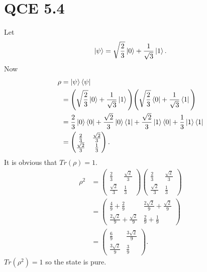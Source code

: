 \documentclass[10pt]{article}
\begin{document}
\section*{QCE 5.4}
Let 
\[
\ket{\psi} = \sqrt{\frac{2}{3}} \ket{0} + \frac{1}{\sqrt{3}} \ket{1}.
\]
Now 
\begin{align*}
\rho &= \ket{\psi} \bra{\psi} \\
        &= \Bigg( \sqrt{\frac{2}{3}} \ket{0} + \frac{1}{\sqrt{3}} \ket{1} \Bigg)\Bigg( \sqrt{\frac{2}{3}} \bra{0} + \frac{1}{\sqrt{3}} \bra{1} \Bigg) \\
        &= \frac{2}{3} \ket{0} \bra{0} + \frac{\sqrt{2}}{3} \ket{0} \bra{1} + \frac{\sqrt{2}}{3} \ket{1} \bra{0} + \frac{1}{3} \ket{1} \bra{1} \\
        &= \begin{pmatrix}
        \frac{2}{3} & \frac{\sqrt{2}}{3} \\
        \frac{\sqrt{2}}{3} & \frac{1}{3}
        \end{pmatrix}.
\end{align*}
It is obvious that $Tr(\rho) = 1$.
\begin{align*}
\rho^2 &= 
\begin{pmatrix}
        \frac{2}{3} & \frac{\sqrt{2}}{3} \\
        \frac{\sqrt{2}}{3} & \frac{1}{3}
\end{pmatrix}
\begin{pmatrix}
        \frac{2}{3} & \frac{\sqrt{2}}{3} \\
        \frac{\sqrt{2}}{3} & \frac{1}{3}
\end{pmatrix} \\
    &= \begin{pmatrix}
    \frac{4}{9} + \frac{2}{9} & \frac{2\sqrt{2}}{9} + \frac{\sqrt{2}}{9} \\
    \frac{2\sqrt{2}}{9} + \frac{\sqrt{2}}{9} & \frac{2}{9} + \frac{1}{9} 
\end{pmatrix}  \\
    &= \begin{pmatrix}
    \frac{6}{9}             & \frac{3\sqrt{2}}{9} \\
    \frac{3\sqrt{2}}{9} & \frac{3}{9}
    \end{pmatrix}.
\end{align*}
$Tr(\rho^2) = 1$ so the state is pure.
\end{document}
